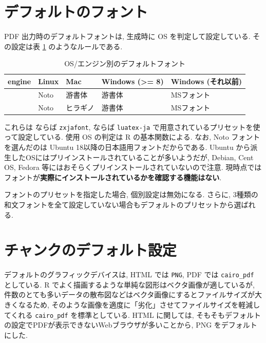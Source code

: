 \documentclass[
  nomag]{bxjsbook}
\theoremstyle{definition}
\theoremstyle{definition}
\theoremstyle{definition}
\theoremstyle{remark}
\begin{document}
\hypertarget{ux30c7ux30d5ux30a9ux30ebux30c8ux306eux30d5ux30a9ux30f3ux30c8}{%
\section{デフォルトのフォント}\label{ux30c7ux30d5ux30a9ux30ebux30c8ux306eux30d5ux30a9ux30f3ux30c8}}

PDF 出力時のデフォルトフォントは, 生成時に OS を判定して設定している.
その設定は表 \ref{tab:font-default} のようなルールである.

\begin{table}

\caption{\label{tab:font-default}OS/エンジン別のデフォルトフォント}
\centering
\begin{tabular}[t]{>{}lllll}
\toprule
engine & Linux & Mac & Windows (>= 8) & Windows (それ以前)\\
\midrule
\cellcolor{gray}{XeLaTeX} & Noto & 游書体 & 游書体 & MSフォント\\
\cellcolor{gray}{LuaLaTeX} & Noto & ヒラギノ & 游書体 & MSフォント\\
\bottomrule
\end{tabular}
\end{table}

これらは \XeLaTeX ならば \texttt{zxjafont}, \LuaLaTeX ならば
\texttt{luatex-ja} で用意されているプリセットを使って設定している. 使用
OS の判定は R の基本関数による. なお, Noto フォントを選んだのは Ubuntu
18以降の日本語用フォントだからである. Ubuntu
から派生したOSにはプリインストールされていることが多いようだが, Debian,
Cent OS, Fedora 等にはおそらくプリインストールされていないので注意.
現時点ではフォントが\textbf{実際にインストールされているかを確認する機能はない}.

フォントのプリセットを指定した場合, 個別設定は無効になる. さらに,
3種類の和文フォントを全て設定していない場合もデフォルトのプリセットから選ばれる.

\hypertarget{ux30c1ux30e3ux30f3ux30afux306eux30c7ux30d5ux30a9ux30ebux30c8ux8a2dux5b9a}{%
\section{チャンクのデフォルト設定}\label{ux30c1ux30e3ux30f3ux30afux306eux30c7ux30d5ux30a9ux30ebux30c8ux8a2dux5b9a}}

デフォルトのグラフィックデバイスは, HTML では \texttt{PNG}, PDF では
\texttt{cairo\_pdf} としている. R
でよく描画するような単純な図形はベクタ画像が適しているが,
件数のとても多いデータの散布図などはベクタ画像にするとファイルサイズが大きくなるため,
そのような画像を適度に「劣化」させてファイルサイズを軽減してくれる
\texttt{cairo\_pdf} を標準としている. HTML に関しては,
そもそもデフォルトの設定でPDFが表示できないWebブラウザが多いことから,
PNG をデフォルトにした.
\end{document}
